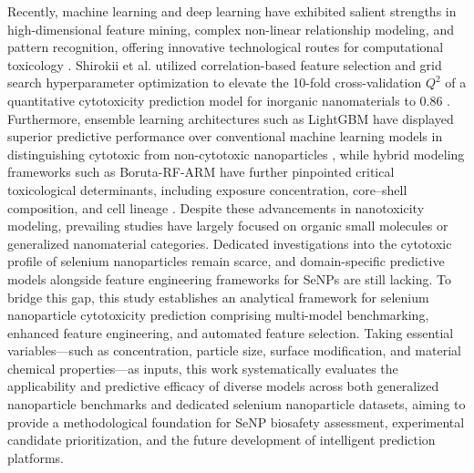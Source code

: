 Recently, machine learning and deep learning have exhibited salient strengths in high-dimensional feature mining, complex non-linear relationship modeling, and pattern recognition, offering innovative technological routes for computational toxicology \cite{hosni2025mlnp}. Shirokii et al. utilized correlation-based feature selection and grid search hyperparameter optimization to elevate the 10-fold cross-validation $Q^2$ of a quantitative cytotoxicity prediction model for inorganic nanomaterials to 0.86 \cite{shirokii2023quantitative}. Furthermore, ensemble learning architectures such as LightGBM have displayed superior predictive performance over conventional machine learning models in distinguishing cytotoxic from non-cytotoxic nanoparticles \cite{hosni2025mlnp}, while hybrid modeling frameworks such as Boruta-RF-ARM have further pinpointed critical toxicological determinants, including exposure concentration, core--shell composition, and cell lineage \cite{yildirim2025rheumatoid}. Despite these advancements in nanotoxicity modeling, prevailing studies have largely focused on organic small molecules or generalized nanomaterial categories. Dedicated investigations into the cytotoxic profile of selenium nanoparticles remain scarce, and domain-specific predictive models alongside feature engineering frameworks for SeNPs are still lacking. To bridge this gap, this study establishes an analytical framework for selenium nanoparticle cytotoxicity prediction comprising multi-model benchmarking, enhanced feature engineering, and automated feature selection. Taking essential variables—such as concentration, particle size, surface modification, and material chemical properties—as inputs, this work systematically evaluates the applicability and predictive efficacy of diverse models across both generalized nanoparticle benchmarks and dedicated selenium nanoparticle datasets, aiming to provide a methodological foundation for SeNP biosafety assessment, experimental candidate prioritization, and the future development of intelligent prediction platforms.
